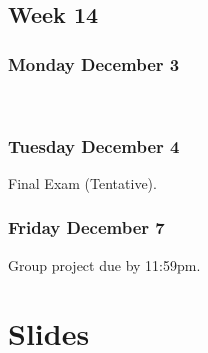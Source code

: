 \documentclass[]{book}
\let\originaltabular\tabular
\let\endoriginaltabular\endtabular
\renewenvironment{tabular}[1]{%
  \begingroup%
  \centering%
  \originaltabular{#1}}%
  {\endoriginaltabular\endgroup}
\theoremstyle{definition}
\theoremstyle{definition}
\theoremstyle{definition}
\theoremstyle{remark}
\begin{document}
\section{Week 14}\label{week-14}

\subsection{Monday December 3}\label{monday-december-3}

\begin{table}[H]
\centering
\begin{tabular}{l}
\hline
\\
\hline
\end{tabular}
\end{table}

\subsection{Tuesday December 4}\label{tuesday-december-4}

\begin{table}[H]
\centering
\begin{tabular}{l}
\hline
Final Exam (Tentative).\\
\hline
\end{tabular}
\end{table}

\subsection{Friday December 7}\label{friday-december-7}

\begin{table}[H]
\centering
\begin{tabular}{l}
\hline
Group project due by 11:59pm.\\
\hline
\end{tabular}
\end{table}

\chapter{Slides}\label{slides}
\end{document}
